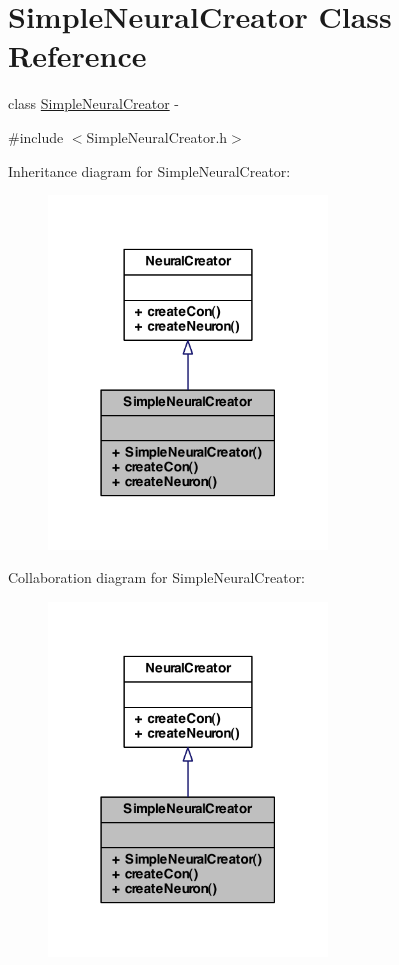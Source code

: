 \hypertarget{class_simple_neural_creator}{
\section{SimpleNeuralCreator Class Reference}
\label{class_simple_neural_creator}
}


class \hyperlink{class_simple_neural_creator}{SimpleNeuralCreator} -\/  




{\ttfamily \#include $<$SimpleNeuralCreator.h$>$}



Inheritance diagram for SimpleNeuralCreator:
\nopagebreak
\begin{figure}[H]
\begin{center}
\leavevmode
\includegraphics[width=210pt]{class_simple_neural_creator__inherit__graph}
\end{center}
\end{figure}


Collaboration diagram for SimpleNeuralCreator:
\nopagebreak
\begin{figure}[H]
\begin{center}
\leavevmode
\includegraphics[width=210pt]{class_simple_neural_creator__coll__graph}
\end{center}
\end{figure}

